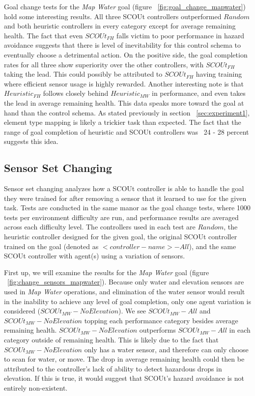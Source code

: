 Goal change tests for the \textit{Map Water} goal (figure ~\ref{fig:goal_change_mapwater}) hold some interesting results.
All three SCOUt controllers outperformed $Random$ and both heuristic controllers in every category except for average remaining health.
The fact that even $SCOUt_{FH}$ falls victim to poor performance in hazard avoidance suggests that there is level of inevitability for this control schema to eventually choose a detrimental action.
On the positive side, the goal completion rates for all three show superiority over the other controllers, with $SCOUt_{FH}$ taking the lead.
This could possibly be attributed to $SCOUt_{FH}$ having training where efficient sensor usage is highly rewarded.
Another interesting note is that $Heuristic_{FH}$ follows closely behind $Heuristic_{MW}$ in performance, and even takes the lead in average remaining health.
This data speaks more toward the goal at hand than the control schema.
As stated previously in section ~\ref{sec:experiment1}, element type mapping is likely a trickier task than expected.
The fact that the range of goal completion of heuristic and SCOUt controllers was ~24 - 28 percent suggests this idea.



\subsection{Sensor Set Changing}
Sensor set changing analyzes how a SCOUt controller is able to handle the goal they were trained for after removing a sensor that it learned to use for the given task.
Tests are conducted in the same manor as the goal change tests, where 1000 tests per environment difficulty are run, and performance results are averaged across each difficulty level.
The controllers used in each test are $Random$, the heuristic controller designed for the given goal, the original SCOUt controller trained on the goal (denoted as $<controller-name> - All$), and the same SCOUt controller with agent(s) using a variation of sensors.

First up, we will examine the results for the \textit{Map Water} goal (figure ~\ref{fig:change_sensors_mapwater}).
Because only water and elevation sensors are used in \textit{Map Water} operations, and elimination of the water sensor would result in the inability to achieve any level of goal completion, only one agent variation is considered ($SCOUt_{MW} - No Elevation$).
We see $SCOUt_{MW} - All$ and $SCOUt_{MW} - No Elevation$ topping each performance category besides average remaining health.
$SCOUt_{MW} - No Elevation$ outperforms $SCOUt_{MW} - All$ in each category outside of remaining health.
This is likely due to the fact that $SCOUt_{MW} - No Elevation$ only has a water sensor, and therefore can only choose to scan for water, or move.
The drop in average remaining health could then be attributed to the controller's lack of ability to detect hazardous drops in elevation.
If this is true, it would suggest that SCOUt's hazard avoidance is not entirely non-existent.

